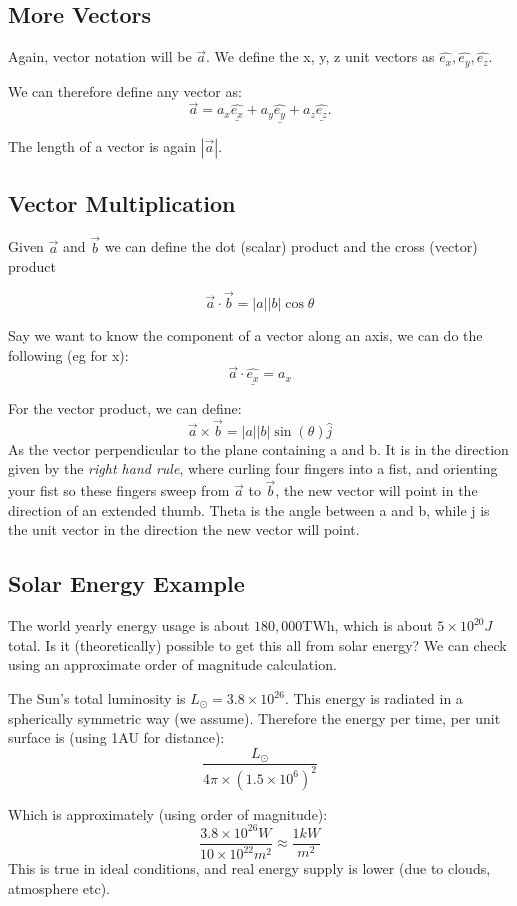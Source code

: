 \subsection{More Vectors}
Again, vector notation will be $\vec{a}$. We define the x, y, z unit vectors as $\hat{e_x}, \hat{e_y}, \hat{e_z}$.

We can therefore define any vector as:
\[
    \vec{a} = a_x \underline{\hat{e_x}} + a_y \underline{\hat{e_y}} + a_z\underline{\hat{e_z}}.
\]

The length of a vector is again $|\vec{a}|$.

\subsection{Vector Multiplication}
Given $\vec{a}$ and $\vec{b}$ we can define the dot (scalar) product and the cross (vector) product

\[
    \vec{a} \cdot \vec{b} = |a||b| \cos \theta
\]

Say we want to know the component of a vector along an axis, we can do the following (eg for x):
\[
    \vec{a} \cdot \underline{\hat{e_x}} = a_x
\]

For the vector product, we can define:
\[
    \vec{a} \times \vec{b} = |a||b| \sin(\theta) \hat{j}
\]
As the vector perpendicular to the plane containing a and b. It is in the direction given by the \emph{right hand rule}, where curling four fingers into a fist, and orienting your fist so these fingers sweep from $\vec{a}$ to $\vec{b}$, the new vector will point in the direction of an extended thumb. Theta is the angle between a and b, while j is the unit vector in the direction the new vector will point.

\subsection{Solar Energy Example}
The world yearly energy usage is about $180,000 \text{TWh}$, which is about $5 \times 10^{20}J$ total. Is it (theoretically) possible to get this all from solar energy? We can check using an approximate order of magnitude calculation.

The Sun's total luminosity is $L_{\odot} = 3.8 \times 10^{26}$. This energy is radiated in a spherically symmetric way (we assume). Therefore the energy per time, per unit surface is (using 1AU for distance):
\[
    \frac{L_{\odot}}{4\pi \times (1.5 \times 10^6)^2}
\]

Which is approximately (using order of magnitude):
\[
    \frac{3.8 \times 10^{26}W}{10 \times 10^{22}m^2} \approx \frac{1kW}{m^2}
\]
This is true in ideal conditions, and real energy supply is lower (due to clouds, atmosphere etc). 


